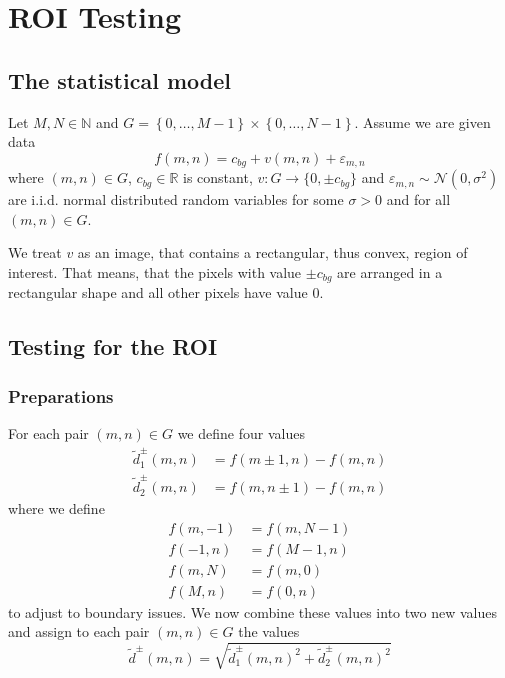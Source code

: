 \documentclass[a4paper,12pt]{article}
\theoremstyle{plain}
\theoremstyle{definition}
\theoremstyle{remark}
\begin{document}
\tableofcontents

\newpage

\section{ROI Testing}

\subsection{The statistical model}

Let $M, N \in \mathbb{N}$ and $G = \left\{ 0, \dots, M-1 \right\} \times  \left\{ 0, \dots, N-1 \right\}$. Assume we are given data
\begin{equation}\label{f}
	f(m, n) = c_{bg} + v(m, n) + \varepsilon_{m, n}
\end{equation}
where $(m, n) \in G$, $c_{bg} \in \mathbb{R}$ is constant, $v: G \to \{ 0, \pm c_{bg} \}$ and $\varepsilon_{m, n} \sim \mathcal{N}(0, \sigma^2)$ are i.i.d. normal distributed random variables for some $\sigma > 0$ and for all $(m, n) \in G$.

We treat $v$ as an image, that contains a rectangular, thus convex, region of interest. That means, that the pixels with value $\pm c_{bg}$ are arranged in a rectangular shape and all other pixels have value $0$.

\subsection{Testing for the ROI}

\subsubsection{Preparations}

For each pair $(m, n) \in G$ we define four values
\begin{align}
	\tilde{d}^\pm_1(m, n) &= f(m \pm 1, n) - f(m, n) \label{d1} \\
	\tilde{d}^\pm_2(m, n) &= f(m, n \pm 1) - f(m, n) \label{d2}
\end{align}
where we define
\begin{align*}
	f(m, -1) &= f(m, N-1) \\
	f(-1, n) &= f(M-1, n) \\
	f(m, N) &= f(m, 0) \\
	f(M, n) &= f(0, n)
\end{align*}
to adjust to boundary issues. We now combine these values into two new values and assign to each pair $(m, n) \in G$ the values
\begin{equation}\label{d_tilde}
	\tilde{d}^\pm(m, n) = \sqrt{\tilde{d}_1^\pm(m, n)^2 + \tilde{d}_2^\pm(m, n)^2}
\end{equation}
\end{document}
